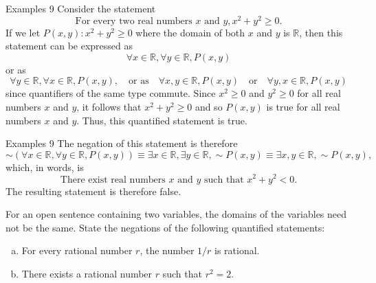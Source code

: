 \documentclass{beamer}
\begin{document}
\begin{frame}{Examples 9}
Consider the statement
$$ \text{For every two real numbers } x \text{ and } y, x^2 + y^2 \ge 0. $$
If we let $P(x, y) : x^2 + y^2 \ge 0$ where the domain of both $x$ and $y$ is $\mathbb{R}$, then this statement can be expressed as
$$ \forall x \in \mathbb{R}, \forall y \in \mathbb{R}, P(x, y) $$
or as
$$ \forall y \in \mathbb{R}, \forall x \in \mathbb{R}, P(x, y), \quad \text{or as} \quad \forall x, y \in \mathbb{R}, P(x, y) \quad \text{or} \quad \forall y, x \in \mathbb{R}, P(x, y) $$
since quantifiers of the same type commute. Since $x^2 \ge 0$ and $y^2 \ge 0$ for all real numbers $x$ and $y$, it follows that $x^2 + y^2 \ge 0$ and so $P(x, y)$ is true for all real numbers $x$ and $y$. Thus, this quantified statement is true.
\end{frame}

\begin{frame}{Examples 9}
The negation of this statement is therefore
$$ \sim (\forall x \in \mathbb{R}, \forall y \in \mathbb{R}, P(x, y)) \equiv \exists x \in \mathbb{R}, \exists y \in \mathbb{R}, \sim P(x, y) \equiv \exists x, y \in \mathbb{R}, \sim P(x, y), $$
which, in words, is
$$ \text{There exist real numbers } x \text{ and } y \text{ such that } x^2 + y^2 < 0. $$
The resulting statement is therefore false.

For an open sentence containing two variables, the domains of the variables need not be the same.
\vspace{0.2cm}
State the negations of the following quantified statements:
\begin{enumerate}[(a)]
    \item For every rational number $r$, the number $1/r$ is rational.
    \item There exists a rational number $r$ such that $r^2 = 2$.
\end{enumerate}
\end{frame}
\end{document}
